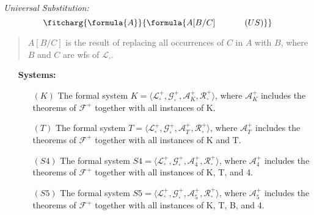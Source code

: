 \documentclass[a4paper, 11pt]{article} %
\newcommand{\tuple}[1]{\langle#1\rangle} %
\begin{document}
\begin{multicols}{2}\it
Universal Substitution:\vspace{-.05in}
\begin{equation*}
\fitcharg{
\formula{A}
}{
\formula{A[B/C] \hspace*{.477in}(US)}
}
\end{equation*}

\vspace*{-.07in}

\begin{quote}\small
$A[B/C]$ is the result of replacing all occurrences of $C$ in $A$ with $B$, where $B$ and $C$ are wfs of $\mathcal{L}_\square$.
\end{quote}

\end{multicols}
\vspace{-.05in}
	
	
\begin{enumerate}[leftmargin=1.2in,labelsep=.15in] %
\item[\bf Systems:]
	\begin{enumerate}
	\item[$(K)$] The formal system $K=\tuple{\mathcal{L}_\square^+,\mathcal{G}_\square^+,\mathcal{A}_K^+,\mathcal{R}_\square^+}$, where $\mathcal{A}_K^+$ includes the theorems of $\mathcal{F}^+$ together with all instances of K.
	\item[$(T)$] The formal system $T=\tuple{\mathcal{L}_\square^+,\mathcal{G}_\square^+,\mathcal{A}_T^+,\mathcal{R}_\square^+}$, where $\mathcal{A}_T^+$ includes the theorems of $\mathcal{F}^+$ together with all instances of K and T.
	\item[$(S4)$] The formal system $S4=\tuple{\mathcal{L}_\square^+,\mathcal{G}_\square^+,\mathcal{A}_4^+,\mathcal{R}_\square^+}$, where $\mathcal{A}_{4}^+$ includes the theorems of $\mathcal{F}^+$ together with all instances of K, T, and 4.
	\item[$(S5)$] The formal system $S5=\tuple{\mathcal{L}_\square^+,\mathcal{G}_\square^+,\mathcal{A}_5^+,\mathcal{R}_\square^+}$, where $\mathcal{A}_{5}^+$ includes the theorems of $\mathcal{F}^+$ together with all instances of K, T, B, and 4.
	\end{enumerate}
\end{enumerate}
\end{document}
